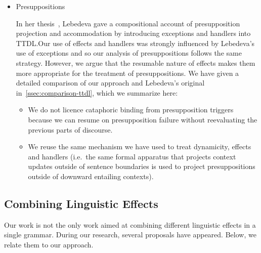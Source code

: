 \begin{itemize}
\item Presuppositions

  In her thesis~\cite{lebedeva2012expression}, Lebedeva gave a
  compositional account of presupposition projection and accommodation by
  introducing exceptions and handlers into TTDL.\@ Our use of effects and
  handlers was strongly influenced by Lebedeva's use of exceptions and so
  our analysis of presuppositions follows the same strategy. However, we
  argue that the resumable nature of effects makes them more appropriate
  for the treatment of presuppositions. We have given a detailed comparison
  of our approach and Lebedeva's original
  in~\ref{ssec:comparison-ttdl}, which we summarize here:

  \begin{itemize}
  \item We do not licence cataphoric binding from presupposition triggers
    because we can resume on presupposition failure without reevaluating
    the previous parts of discourse.
  \item We reuse the same mechanism we have used to treat dynamicity,
    effects and handlers (i.e.\ the same formal apparatus that projects
    context updates outside of sentence boundaries is used to project
    presuppositions outside of downward entailing contexts).
  \end{itemize}
\end{itemize}


\subsection{Combining Linguistic Effects}
\label{ssec:comparison-combining}

Our work is not the only work aimed at combining different linguistic
effects in a single grammar. During our research, several proposals have
appeared. Below, we relate them to our approach.

